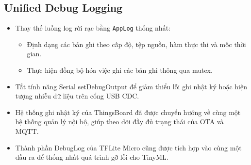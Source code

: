 \subsection{Unified Debug Logging}
\begin{itemize}
    \item Thay thế luồng log rời rạc bằng \texttt{AppLog} thống nhất:
    \begin{itemize}
        \item Định dạng các bản ghi theo cấp độ, tệp nguồn, hàm thực thi và mốc thời gian.
        \item Thực hiện đồng bộ hóa việc ghi các bản ghi thông qua mutex.
    \end{itemize}
    \item Tắt tính năng Serial setDebugOutput để giảm thiểu lỗi ghi nhật ký hoặc hiện tượng nhiễu dữ liệu trên cổng USB CDC.
    \item Hệ thống ghi nhật ký của ThingsBoard đã được chuyển hướng về cùng một hệ thống quản lý nội bộ, giúp theo dõi đầy đủ trạng thái của OTA và MQTT.
    \item Thành phần DebugLog của TFLite Micro cũng được tích hợp vào cùng một đầu ra để thống nhất quá trình gỡ lỗi cho TinyML.
\end{itemize}
